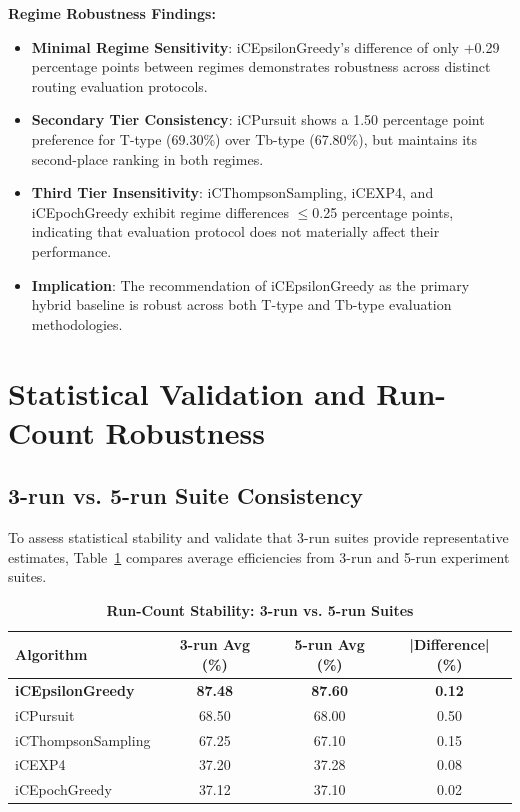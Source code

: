 \documentclass[12pt,a4paper]{article}
\newcommand{\performance}[1]{\textcolor{performancecolor}{\textbf{#1}}}
\newcommand{\critical}[1]{\textcolor{criticalcolor}{\textbf{#1}}}
\newcommand{\success}[1]{\textcolor{successcolor}{\textbf{#1}}}
\begin{document}
\textbf{Regime Robustness Findings:}

\begin{itemize}
\item \performance{Minimal Regime Sensitivity}: iCEpsilonGreedy's difference of only +0.29 percentage points between regimes demonstrates robustness across distinct routing evaluation protocols.
\item \performance{Secondary Tier Consistency}: iCPursuit shows a 1.50 percentage point preference for T-type (69.30\%) over Tb-type (67.80\%), but maintains its second-place ranking in both regimes.
\item \performance{Third Tier Insensitivity}: iCThompsonSampling, iCEXP4, and iCEpochGreedy exhibit regime differences $\leq$0.25 percentage points, indicating that evaluation protocol does not materially affect their performance.
\item \critical{Implication}: The recommendation of iCEpsilonGreedy as the primary hybrid baseline is robust across both T-type and Tb-type evaluation methodologies.
\end{itemize}

\section{Statistical Validation and Run-Count Robustness}

\subsection{3-run vs. 5-run Suite Consistency}

To assess statistical stability and validate that 3-run suites provide representative estimates, Table~\ref{tab:run-count-stability} compares average efficiencies from 3-run and 5-run experiment suites.

\begin{table}[H]
\centering
\caption{\success{Run-Count Stability: 3-run vs. 5-run Suites}}
\label{tab:run-count-stability}
\begin{tabular}{|l|c|c|c|}
\hline
\textbf{Algorithm} & \textbf{3-run Avg (\%)} & \textbf{5-run Avg (\%)} & \textbf{|Difference| (\%)} \\
\hline
\hline
\success{iCEpsilonGreedy}   & \success{87.48} & \success{87.60} & \success{0.12} \\
iCPursuit                   & 68.50 & 68.00 & 0.50 \\
iCThompsonSampling          & 67.25 & 67.10 & 0.15 \\
iCEXP4                      & 37.20 & 37.28 & 0.08 \\
iCEpochGreedy               & 37.12 & 37.10 & 0.02 \\
\hline
\end{tabular}
\end{table}
\end{document}
